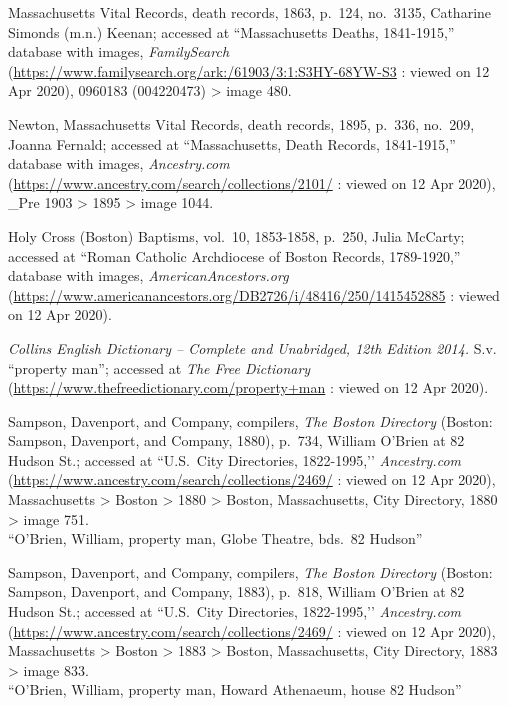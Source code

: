 \begin{thebibliography}{999}
	Massachusetts Vital Records, death records, 1863, p.\ 124, no.\ 3135, Catharine Simonds (m.n.) Keenan; accessed at ``Massachusetts Deaths, 1841-1915,'' database with images, \textit{FamilySearch} (\url{https://www.familysearch.org/ark:/61903/3:1:S3HY-68YW-S3} : viewed on 12 Apr 2020), 0960183 (004220473) > image 480.
	
	Newton, Massachusetts Vital Records, death records, 1895, p.\ 336, no.\ 209, Joanna Fernald; accessed at ``Massachusetts, Death Records, 1841-1915,'' database with images, \textit{Ancestry.com} (\url{https://www.ancestry.com/search/collections/2101/} : viewed on 12 Apr 2020), \_Pre 1903 > 1895 > image 1044.
	
	Holy Cross (Boston) Baptisms, vol.\ 10, 1853-1858, p.\ 250, Julia McCarty; accessed at ``Roman Catholic Archdiocese of Boston Records, 1789-1920,'' database with images, \textit{AmericanAncestors.org} (\url{https://www.americanancestors.org/DB2726/i/48416/250/1415452885} : viewed on 12 Apr 2020).	
	
	\textit{Collins English Dictionary -- Complete and Unabridged, 12th Edition 2014.} S.v. ``property man''; accessed at \textit{The Free Dictionary} (\url{https://www.thefreedictionary.com/property+man} : viewed on 12 Apr 2020).
	
	Sampson, Davenport, and Company, compilers, \textit{The Boston Directory} (Boston: Sampson, Davenport, and Company, 1880), p.\ 734, William O'Brien at 82 Hudson St.; accessed at ``U.S.\ City Directories, 1822-1995,’’ \textit{Ancestry.com} (\url{https://www.ancestry.com/search/collections/2469/} : viewed on 12 Apr 2020), Massachusetts > Boston > 1880 > Boston, Massachusetts, City Directory, 1880 > image 751.\\
	``O'Brien, William, property man, Globe Theatre, bds.\ 82 Hudson''
	
	Sampson, Davenport, and Company, compilers, \textit{The Boston Directory} (Boston: Sampson, Davenport, and Company, 1883), p.\ 818, William O'Brien at 82 Hudson St.; accessed at ``U.S.\ City Directories, 1822-1995,’’ \textit{Ancestry.com} (\url{https://www.ancestry.com/search/collections/2469/} : viewed on 12 Apr 2020), Massachusetts > Boston > 1883 > Boston, Massachusetts, City Directory, 1883 > image 833.\\
	``O'Brien, William, property man, Howard Athenaeum, house 82 Hudson''
	

\end{thebibliography}
